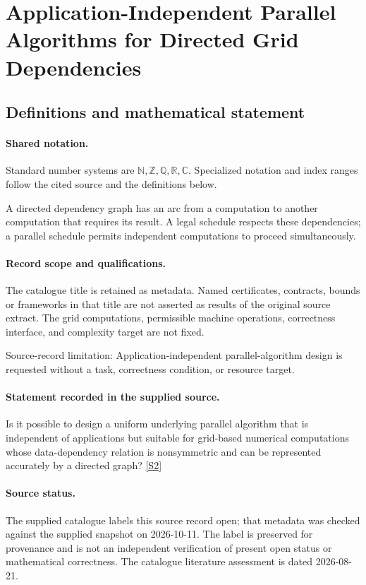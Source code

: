 \documentclass[11pt]{article}
\newcommand{\sref}[2]{\hyperlink{source:#1:#2}{[S#2]}}
\begin{document}
\section{Application-Independent Parallel Algorithms for Directed Grid Dependencies}\label{statement}

\subsection{Definitions and mathematical statement}

\paragraph{Shared notation.}Standard number systems are $\mathbb N,\mathbb Z,\mathbb Q,\mathbb R,\mathbb C$. Specialized notation and index ranges follow the cited source and the definitions below.


A directed dependency graph has an arc from a computation to another computation that requires its result. A legal schedule respects these dependencies; a parallel schedule permits independent computations to proceed simultaneously.
\paragraph{Record scope and qualifications.}
The catalogue title is retained as metadata. Named certificates, contracts, bounds or frameworks in that title are not asserted as results of the original source extract.
The grid computations, permissible machine operations, correctness interface, and complexity target are not fixed.

Source-record limitation: Application-independent parallel-algorithm design is requested without a task, correctness condition, or resource target.
\paragraph{Statement recorded in the supplied source.}
Is it possible to design a uniform underlying parallel algorithm that is independent of applications but suitable for grid-based numerical computations whose data-dependency relation is nonsymmetric and can be represented accurately by a directed graph? \sref{statement}{2}
\paragraph{Source status.}
The supplied catalogue labels this source record open; that metadata was checked against the supplied snapshot on 2026-10-11. The label is preserved for provenance and is not an independent verification of present open status or mathematical correctness. The catalogue literature assessment is dated 2026-08-21.
\end{document}
